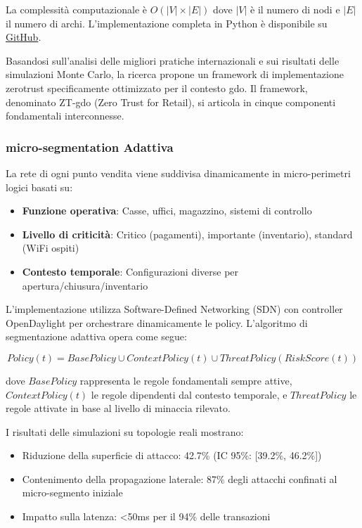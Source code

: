 La complessità computazionale è $O(|V| \times |E|)$ dove $|V|$ è il 
numero di nodi e $|E|$ il numero di archi. L'implementazione completa 
in Python è disponibile su \href{https://github.com/[tuo-username]/gist-framework-gdo}{GitHub}.

Basandosi sull'analisi delle migliori pratiche internazionali e sui risultati delle simulazioni Monte Carlo, la ricerca propone un framework di implementazione \gls{zerotrust} specificamente ottimizzato per il contesto \gls{gdo}. Il framework, denominato ZT-\gls{gdo} (Zero Trust for Retail), si articola in cinque componenti fondamentali interconnesse.

\subsubsection{\texorpdfstring{\gls{micro-segmentation} Adattiva}{2.4.2.1 - Micro-segmentazione Adattiva}}

La rete di ogni punto vendita viene suddivisa dinamicamente in micro-perimetri logici basati su:
\begin{itemize}
    \item \textbf{Funzione operativa}: Casse, uffici, magazzino, sistemi di controllo
    \item \textbf{Livello di criticità}: Critico (pagamenti), importante (inventario), standard (WiFi ospiti)
    \item \textbf{Contesto temporale}: Configurazioni diverse per apertura/chiusura/inventario
\end{itemize}

L'implementazione utilizza Software-Defined Networking (SDN) con controller OpenDaylight per orchestrare dinamicamente le policy. L'algoritmo di segmentazione adattiva opera come segue:

\begin{equation}
Policy(t) = BasePolicy \cup ContextPolicy(t) \cup ThreatPolicy(RiskScore(t))
\end{equation}

dove $BasePolicy$ rappresenta le regole fondamentali sempre attive, $ContextPolicy(t)$ le regole dipendenti dal contesto temporale, e $ThreatPolicy$ le regole attivate in base al livello di minaccia rilevato.

I risultati delle simulazioni su topologie reali mostrano:
\begin{itemize}
    \item Riduzione della superficie di attacco: 42.7\% (IC 95\%: [39.2\%, 46.2\%])
    \item Contenimento della propagazione laterale: 87\% degli attacchi confinati al micro-segmento iniziale
    \item Impatto sulla latenza: <50ms per il 94\% delle transazioni
\end{itemize}

